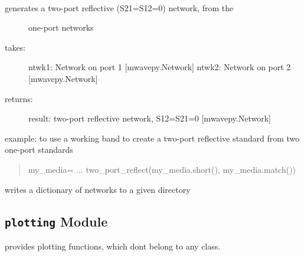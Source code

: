 \documentclass[letterpaper,10pt,english]{sphinxmanual}
\begin{document}
\begin{fulllineitems}
\label{api/mwavepy:mwavepy.network.two_port_reflect}~\begin{description}
\item[{generates a two-port reflective (S21=S12=0) network, from the}]  one-port networks

\item[{takes:}] \leavevmode
ntwk1: Network on  port 1 {[}mwavepy.Network{]}
ntwk2: Network on  port 2 {[}mwavepy.Network{]}

\item[{returns:}] \leavevmode
result: two-port reflective network, S12=S21=0 {[}mwavepy.Network{]}

\end{description}

example:
to use a working band to create a two-port reflective standard from
two one-port standards
\begin{quote}

my\_media= ...
two\_port\_reflect(my\_media.short(), my\_media.match())
\end{quote}

\end{fulllineitems}


\begin{fulllineitems}
\label{api/mwavepy:mwavepy.network.write_dict_of_networks}
writes a dictionary of networks to a given directory

\end{fulllineitems}



\subsection{\texttt{plotting} Module}
\label{api/mwavepy:plotting-module}\label{api/mwavepy:module-mwavepy.plotting}
provides plotting functions, which dont belong to any class.
\end{document}
